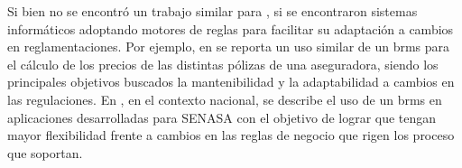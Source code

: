 
Si bien no se encontró un trabajo similar para , si se encontraron sistemas informáticos adoptando motores de reglas para facilitar su adaptación a cambios en reglamentaciones. 
Por ejemplo, en \cite{medic2019calculation} se reporta un uso similar de un \acrshort{brms} \cite{proctor2012drools} para el cálculo de los precios de las distintas pólizas de una aseguradora, siendo los principales objetivos buscados la mantenibilidad y la adaptabilidad a cambios en las regulaciones.
%
En \cite{sampol2019sistema}, en el contexto nacional, se describe el uso de un \acrshort{brms} en aplicaciones desarrolladas para SENASA con el objetivo de lograr que tengan mayor flexibilidad frente a cambios en las reglas de negocio que rigen los proceso que soportan.

